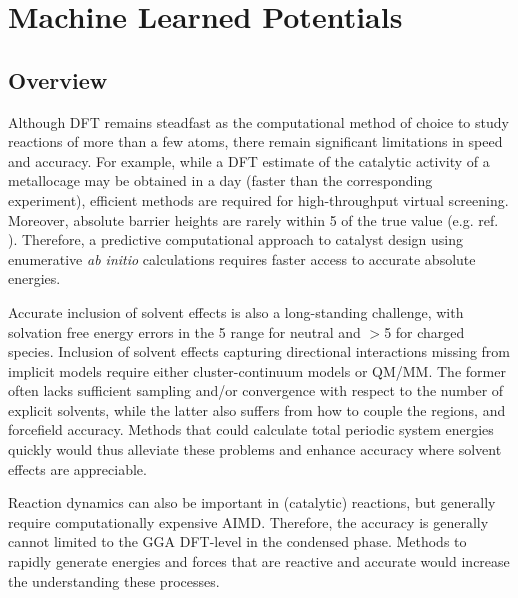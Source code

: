 \documentclass[../../main.tex]{subfiles}
\begin{document}
\setcounter{footnote}{0} 
\newcommand{\rom}[1]{\uppercase\expandafter{\romannumeral #1\relax}}


\chapter{Machine Learned Potentials}

\section{Overview}

Although DFT remains steadfast as the computational method of choice to study reactions of more than a few atoms,\cite{PribramJones2015} there remain significant limitations in speed and accuracy.\cite{Mardirossian2017} For example, while a DFT estimate of the catalytic activity of a metallocage may be obtained in a day\cite{Young2019} (faster than the corresponding experiment), efficient methods are required for high-throughput virtual screening. Moreover, absolute barrier heights are rarely within 5 \kcalx of the true value (e.g. ref. \cite{Krongchon2017}). Therefore, a predictive computational approach to catalyst design using enumerative \emph{ab initio} calculations requires faster access to accurate absolute energies. 

Accurate inclusion of solvent effects is also a long-standing challenge, with solvation free energy errors in the 5 \kcalx range for neutral and $>$5 \kcalx for charged species.\cite{Takano2004, Zhang2017} Inclusion of solvent effects capturing directional interactions missing from implicit models require either cluster-continuum models or QM/MM. The former often lacks sufficient sampling and/or convergence with respect to the number of explicit solvents,\cite{Basdogan2018} while the latter also suffers from how to couple the regions, and forcefield accuracy.\cite{Thiel2009} Methods that could calculate total periodic system energies quickly would thus alleviate these problems and enhance accuracy where solvent effects are appreciable.

Reaction dynamics can also be important in (catalytic) reactions,\cite{Grajciar2018, Stirling2014} but generally require computationally expensive AIMD. Therefore, the accuracy is generally cannot limited to the GGA DFT-level in the condensed phase.\cite{Hassanali2014} Methods to rapidly generate energies and forces that are reactive and accurate would increase the understanding these processes.
\end{document}
